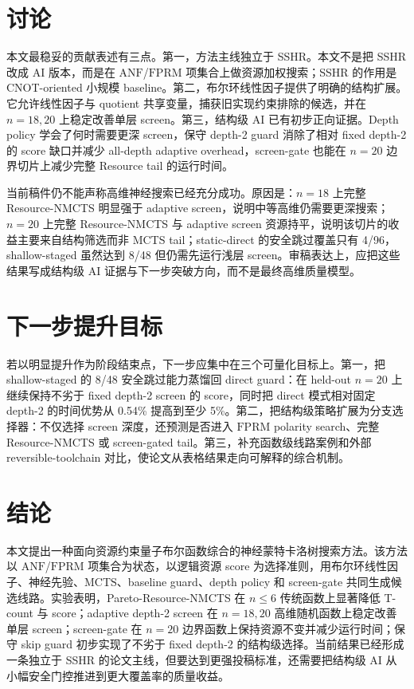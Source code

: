 \documentclass[UTF8,fontset=macnew,11pt]{ctexart}
\newcommand{\method}{Resource-NMCTS}
\newcommand{\pareto}{Pareto-Resource-NMCTS}
\newcommand{\anf}{\ensuremath{\mathrm{ANF}}}
\newcommand{\fprm}{\ensuremath{\mathrm{FPRM}}}
\newcommand{\mcts}{\ensuremath{\mathrm{MCTS}}}
\begin{document}
\section{讨论}

本文最稳妥的贡献表述有三点。第一，方法主线独立于 SSHR。本文不是把 SSHR 改成 AI 版本，而是在 \anf{}/\fprm{} 项集合上做资源加权搜索；SSHR 的作用是 CNOT-oriented 小规模 baseline。第二，布尔环线性因子提供了明确的结构扩展。它允许线性因子与 quotient 共享变量，捕获旧实现约束排除的候选，并在 $n=18,20$ 上稳定改善单层 screen。第三，结构级 AI 已有初步正向证据。Depth policy 学会了何时需要更深 screen，保守 depth-2 guard 消除了相对 fixed depth-2 的 score 缺口并减少 all-depth adaptive overhead，screen-gate 也能在 $n=20$ 边界切片上减少完整 Resource tail 的运行时间。

当前稿件仍不能声称高维神经搜索已经充分成功。原因是：$n=18$ 上完整 \method{} 明显强于 adaptive screen，说明中等高维仍需要更深搜索；$n=20$ 上完整 \method{} 与 adaptive screen 资源持平，说明该切片的收益主要来自结构筛选而非 MCTS tail；static-direct 的安全跳过覆盖只有 4/96，shallow-staged 虽然达到 8/48 但仍需先运行浅层 screen。审稿表达上，应把这些结果写成结构级 AI 证据与下一步突破方向，而不是最终高维质量模型。

\section{下一步提升目标}

若以明显提升作为阶段结束点，下一步应集中在三个可量化目标上。第一，把 shallow-staged 的 8/48 安全跳过能力蒸馏回 direct guard：在 held-out $n=20$ 上继续保持不劣于 fixed depth-2 screen 的 score，同时把 direct 模式相对固定 depth-2 的时间优势从 0.54\% 提高到至少 5\%。第二，把结构级策略扩展为分支选择器：不仅选择 screen 深度，还预测是否进入 \fprm{} polarity search、完整 \method{} 或 screen-gated tail。第三，补充函数级线路案例和外部 reversible-toolchain 对比，使论文从表格结果走向可解释的综合机制。

\section{结论}

本文提出一种面向资源约束量子布尔函数综合的神经蒙特卡洛树搜索方法。该方法以 \anf{}/\fprm{} 项集合为状态，以逻辑资源 score 为选择准则，用布尔环线性因子、神经先验、\mcts{}、baseline guard、depth policy 和 screen-gate 共同生成候选线路。实验表明，\pareto{} 在 $n\leq6$ 传统函数上显著降低 T-count 与 score；adaptive depth-2 screen 在 $n=18,20$ 高维随机函数上稳定改善单层 screen；screen-gate 在 $n=20$ 边界函数上保持资源不变并减少运行时间；保守 skip guard 初步实现了不劣于 fixed depth-2 的结构级选择。当前结果已经形成一条独立于 SSHR 的论文主线，但要达到更强投稿标准，还需要把结构级 AI 从小幅安全门控推进到更大覆盖率的质量收益。
\end{document}
